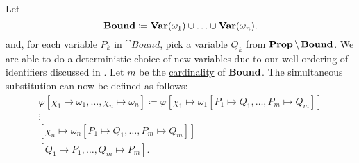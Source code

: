 \begin{definition}
\begin{thmenum}
    Let
    \begin{equation*}
      \operatorname{\mathbf{Bound}} \coloneqq \operatorname{\mathbf{Var}}(\omega_1) \cup \ldots \cup \operatorname{\mathbf{Var}}(\omega_n).
    \end{equation*}
    and, for each variable \( P_k \) in \( \cat{Bound} \), pick a variable \( Q_k \) from \( \operatorname{\mathbf{Prop}} \setminus \operatorname{\mathbf{Bound}} \). We are able to do a deterministic choice of new variables due to our well-ordering of identifiers discussed in . Let \( m \) be the \hyperref[def:cardinal]{cardinality} of \( \operatorname{\mathbf{Bound}} \). The simultaneous substitution can now be defined as follows:
    \begin{align*}
      \varphi[\chi_1 \mapsto \omega_1, \ldots, \chi_n \mapsto \omega_n] \coloneqq \varphi
      [\chi_1 \mapsto \omega_1[P_1 \mapsto Q_1, \ldots, P_m \mapsto Q_m]] \\
      \vdots \hspace{3cm} \\
      [\chi_n \mapsto \omega_n[P_1 \mapsto Q_1, \ldots, P_m \mapsto Q_m]] \\
      [Q_1 \mapsto P_1, \ldots, Q_m \mapsto P_m].
    \end{align*}
  \end{thmenum}
\end{definition}

